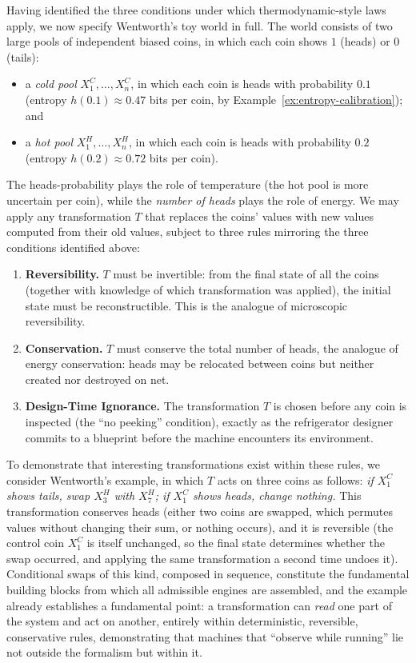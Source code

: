 \documentclass[11pt]{article}
\begin{document}
Having identified the three conditions under which thermodynamic-style laws apply, we now specify Wentworth's toy world in full. The world consists of two large pools of independent biased coins, in which each coin shows $1$ (heads) or $0$ (tails):

\begin{itemize}[leftmargin=2em]
  \item a \emph{cold pool} $X^C_1, \dots, X^C_n$, in which each coin is heads with probability $0.1$ (entropy $h(0.1) \approx 0.47$ bits per coin, by Example~\ref{ex:entropy-calibration}); and
  \item a \emph{hot pool} $X^H_1, \dots, X^H_n$, in which each coin is heads with probability $0.2$ (entropy $h(0.2) \approx 0.72$ bits per coin).
\end{itemize}

The heads-probability plays the role of temperature (the hot pool is more uncertain per coin), while the \emph{number of heads} plays the role of energy. We may apply any transformation $T$ that replaces the coins' values with new values computed from their old values, subject to three rules mirroring the three conditions identified above:

\begin{enumerate}[leftmargin=2em]
  \item \textbf{Reversibility.} $T$ must be invertible: from the final state of all the coins (together with knowledge of which transformation was applied), the initial state must be reconstructible. This is the analogue of microscopic reversibility.
  \item \textbf{Conservation.} $T$ must conserve the total number of heads, the analogue of energy conservation: heads may be relocated between coins but neither created nor destroyed on net.
  \item \textbf{Design-Time Ignorance.} The transformation $T$ is chosen before any coin is inspected (the ``no peeking'' condition), exactly as the refrigerator designer commits to a blueprint before the machine encounters its environment.
\end{enumerate}

To demonstrate that interesting transformations exist within these rules, we consider Wentworth's example, in which $T$ acts on three coins as follows: \emph{if $X^C_1$ shows tails, swap $X^H_3$ with $X^H_7$; if $X^C_1$ shows heads, change nothing.} This transformation conserves heads (either two coins are swapped, which permutes values without changing their sum, or nothing occurs), and it is reversible (the control coin $X^C_1$ is itself unchanged, so the final state determines whether the swap occurred, and applying the same transformation a second time undoes it). Conditional swaps of this kind, composed in sequence, constitute the fundamental building blocks from which all admissible engines are assembled, and the example already establishes a fundamental point: a transformation can \emph{read} one part of the system and act on another, entirely within deterministic, reversible, conservative rules, demonstrating that machines that ``observe while running'' lie not outside the formalism but within it.
\end{document}
